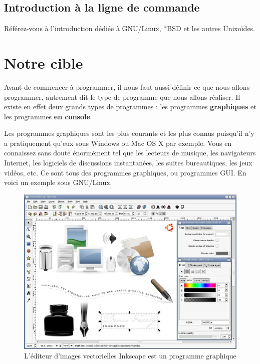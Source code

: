 \subsection{Introduction à la ligne de
commande}\label{introduction-uxe0-la-ligne-de-commande}

Référez-vous à l'introduction dédiée à GNU/Linux, *BSD et les autres
Unixoïdes.

\section{Notre cible}

Avant de commencer à programmer, il nous faut aussi définir ce que
nous allons programmer, autrement dit le type de programme que nous
allons réaliser. Il existe en effet deux grands types de programmes :
les programmes \textbf{graphiques} et les programmes \textbf{en
  console}.

Les programmes graphiques sont les plus courants et les plus connus
puisqu'il n'y a pratiquement qu'eux sous Windows ou Mac OS X par
exemple. Vous en connaissez sans doute énormément tel que les lecteurs
de musique, les navigateurs Internet, les logiciels de discussions
instantanées, les suites bureautiques, les jeux vidéos, etc. Ce sont
tous des programmes graphiques, ou programmes GUI. En voici un exemple
sous GNU/Linux.

\begin{figure}[!ht]
\centering
\includegraphics[scale=0.4]{images/Inskape_screenshot.jpg}
\caption{L'éditeur d'images vectorielles Inkscape est un programme
graphique}
\end{figure}

